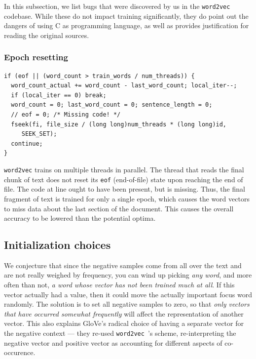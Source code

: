 \documentclass[11pt]{book}
\newcommand*\circled[1]{\tikz[baseline=(char.base)]{
            \node[shape=circle,fill=pairedOneLightBlue,inner sep=1pt] (char) {#1};}}
\newcommand{\wtov}{\texttt{word2vec }}
\begin{document}
In this subsection, we list bugs that were discovered by us in the \texttt{word2vec}
codebase. While these do not impact training significantly, they do point out
the dangers of using C as programming language, as well as provides justification
for reading the original sources.

\subsubsection{Epoch resetting}

\begin{verbatim}
if (eof || (word_count > train_words / num_threads)) {
  word_count_actual += word_count - last_word_count; local_iter--;
  if (local_iter == 0) break;
  word_count = 0; last_word_count = 0; sentence_length = 0;
  // eof = 0; /* Missing code! */
  fseek(fi, file_size / (long long)num_threads * (long long)id,
     SEEK_SET);
  continue;
}
\end{verbatim}

\texttt{word2vec} trains on multiple threads in parallel. The thread that reads
the final chunk of text does not reset its \texttt{eof} (end-of-file) state
upon reaching the end of file. The code at line \circled{5} ought to have been present,
but is missing. Thus, the final fragment of text is trained for only a single
epoch, which causes the word vectors to miss data about the last section of the document.
This causes the overall accuracy  to be lowered than the potential optima.

\subsection{Initialization choices}

We conjecture that since the negative samples come from all over the text and
are not really weighed by frequency, you can wind up picking \emph{any word},
and more often than not, \emph{a word whose vector has not been trained much at
all}.  If this vector actually had a value, then it could move the actually
important focus word randomly. The solution is to set all negative samples to
zero, so that \emph{only vectors that have occurred somewhat frequently} will
affect the representation of another vector. This also explains GloVe's radical
choice of having a separate vector for the negative context --- they re-used
\wtov's  scheme, re-interpreting the negative vector and positive vector as
accounting for different aspects of co-occurence.
\end{document}

